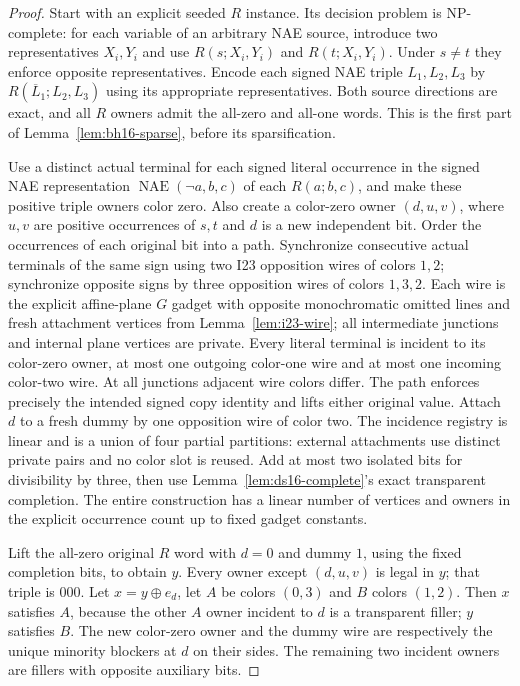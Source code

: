 \documentclass[11pt]{article}
\begin{document}
\begin{proof}
Start with an explicit seeded $R$ instance. Its decision problem is NP-complete: for each variable of an arbitrary NAE source, introduce two representatives $X_i,Y_i$ and use $R(s;X_i,Y_i)$ and $R(t;X_i,Y_i)$. Under $s\ne t$ they enforce opposite representatives. Encode each signed NAE triple $L_1,L_2,L_3$ by $R(\overline L_1;L_2,L_3)$ using its appropriate representatives. Both source directions are exact, and all $R$ owners admit the all-zero and all-one words. This is the first part of Lemma~\ref{lem:bh16-sparse}, before its sparsification.

Use a distinct actual terminal for each signed literal occurrence in the signed NAE representation $\operatorname{NAE}(\neg a,b,c)$ of each $R(a;b,c)$, and make these positive triple owners color zero. Also create a color-zero owner $(d,u,v)$, where $u,v$ are positive occurrences of $s,t$ and $d$ is a new independent bit. Order the occurrences of each original bit into a path. Synchronize consecutive actual terminals of the same sign using two I23 opposition wires of colors $1,2$; synchronize opposite signs by three opposition wires of colors $1,3,2$. Each wire is the explicit affine-plane $G$ gadget with opposite monochromatic omitted lines and fresh attachment vertices from Lemma~\ref{lem:i23-wire}; all intermediate junctions and internal plane vertices are private. Every literal terminal is incident to its color-zero owner, at most one outgoing color-one wire and at most one incoming color-two wire. At all junctions adjacent wire colors differ. The path enforces precisely the intended signed copy identity and lifts either original value. Attach $d$ to a fresh dummy by one opposition wire of color two. The incidence registry is linear and is a union of four partial partitions: external attachments use distinct private pairs and no color slot is reused. Add at most two isolated bits for divisibility by three, then use Lemma~\ref{lem:ds16-complete}'s exact transparent completion. The entire construction has a linear number of vertices and owners in the explicit occurrence count up to fixed gadget constants.

Lift the all-zero original $R$ word with $d=0$ and dummy $1$, using the fixed completion bits, to obtain $y$. Every owner except $(d,u,v)$ is legal in $y$; that triple is $000$. Let $x=y\oplus e_d$, let $A$ be colors $(0,3)$ and $B$ colors $(1,2)$. Then $x$ satisfies $A$, because the other $A$ owner incident to $d$ is a transparent filler; $y$ satisfies $B$. The new color-zero owner and the dummy wire are respectively the unique minority blockers at $d$ on their sides. The remaining two incident owners are fillers with opposite auxiliary bits.


\end{proof}
\end{document}
